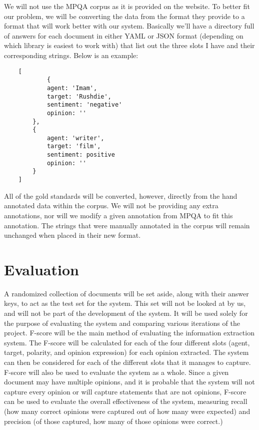 \documentclass{article}
\begin{document}
    We will not use the MPQA corpus as it is provided on the website. To better fit our problem, we will be converting the data from the format they provide to a format that will work better with our system. Basically we'll have a directory full of answers for each document in either YAML or JSON format (depending on which library is easiest to work with) that list out the three slots I have and their corresponding strings. Below is an example:\\
    \begin{lstlisting}
	[
    		{
			agent: 'Imam',
			target: 'Rushdie',
			sentiment: 'negative'
			opinion: ''
		},
		{
			agent: 'writer',
			target: 'film',
			sentiment: positive
			opinion: ''
		}
	]
    \end{lstlisting}

    All of the gold standards will be converted, however, directly from the hand annotated data within the corpus. We will not be providing any extra annotations, nor will we modify a given annotation from MPQA to fit this annotation. The strings that were manually annotated in the corpus will remain unchanged when placed in their new format.

    \section{Evaluation}

    A randomized collection of documents will be set aside, along with their answer keys, to act as the test set for the system. This set will not be looked at by us, and will not be part of the development of the system. It will be used solely for the purpose of evaluating the system and comparing various iterations of the project.
    F-score will be the main method of evaluating the information extraction system. The F-score will be calculated for each of the four different slots (agent, target, polarity, and opinion expression) for each opinion extracted. The system can then be considered for each of the different slots that it manages to capture.
    F-score will also be used to evaluate the system as a whole. Since a given document may have multiple opinions, and it is probable that the system will not capture every opinion or will capture statements that are not opinions, F-score can be used to evaluate the overall effectiveness of the system, measuring recall (how many correct opinions were captured out of how many were expected) and precision (of those captured, how many of those opinions were correct.)
\end{document}
